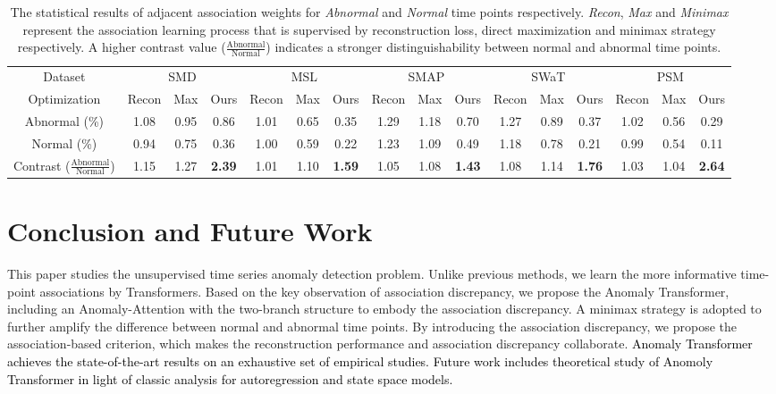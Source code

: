 \documentclass{article} %
\newcommand{\update}[1]{{\textcolor{black}{#1}}}
\begin{document}
\begin{table}[hbp] %
    \vspace{-2pt}
    \caption{The statistical results of adjacent association weights for \emph{Abnormal} and \emph{Normal} time points respectively. \emph{Recon}, \emph{Max} and \emph{Minimax} represent the association learning process that is supervised by reconstruction loss, direct maximization and minimax strategy respectively. A higher contrast value ($\frac{\text{Abnormal}}{\text{Normal}}$) indicates a stronger distinguishability between normal and abnormal time points. }\label{tab:analysis}
    \vspace{-8pt}
    \vskip 0.05in
    \centering
    \begin{small}
    \renewcommand{\multirowsetup}{\centering}
    \setlength{\tabcolsep}{1.45pt}
    \begin{tabular}{c|ccccccccccccccc}
    \toprule
    Dataset & \multicolumn{3}{c}{SMD} & \multicolumn{3}{c}{MSL} & \multicolumn{3}{c}{SMAP} & \multicolumn{3}{c}{SWaT} & \multicolumn{3}{c}{PSM} \\
    \cmidrule(lr){2-4}\cmidrule(lr){5-7}\cmidrule(lr){8-10}\cmidrule(lr){11-13}\cmidrule(lr){14-16}
    Optimization & Recon & Max & Ours & Recon & Max & Ours & Recon & Max & Ours & Recon & Max & Ours & Recon & Max & Ours \\
    \midrule
    Abnormal (\%) & 1.08 &0.95 & 0.86 & 1.01 & 0.65& 0.35 & 1.29 &1.18 & 0.70 & 1.27 &0.89 & 0.37 & 1.02 & 0.56 & 0.29 \\
    Normal (\%) & 0.94 & 0.75& 0.36 & 1.00 &0.59 & 0.22 & 1.23 &1.09 & 0.49 & 1.18 &0.78 & 0.21 & 0.99 &0.54 & 0.11\\
    \midrule
    Contrast ($\frac{\text{Abnormal}}{\text{Normal}}$) & 1.15 &1.27 & \textbf{2.39} & 1.01 &1.10 & \textbf{1.59} & 1.05 &1.08 & \textbf{1.43} & 1.08 & 1.14& \textbf{1.76} & 1.03 &1.04 & \textbf{2.64} \\
    \bottomrule
    \end{tabular}
    \end{small}
    \vspace{-10pt}
\end{table}

\section{Conclusion and Future Work}
This paper studies the unsupervised time series anomaly detection problem. Unlike previous methods, we learn the more informative time-point associations by Transformers. Based on the key observation of association discrepancy, we propose the Anomaly Transformer, including an Anomaly-Attention with the two-branch structure to embody the association discrepancy. A minimax strategy is adopted to further amplify the difference between normal and abnormal time points. By introducing the association discrepancy, we propose the association-based criterion, which makes the reconstruction performance and association discrepancy collaborate. \update{Anomaly Transformer achieves the state-of-the-art results on an exhaustive set of empirical studies. Future work includes theoretical study of Anomoly Transformer in light of classic analysis for autoregression and state space models.} 
\end{document}
